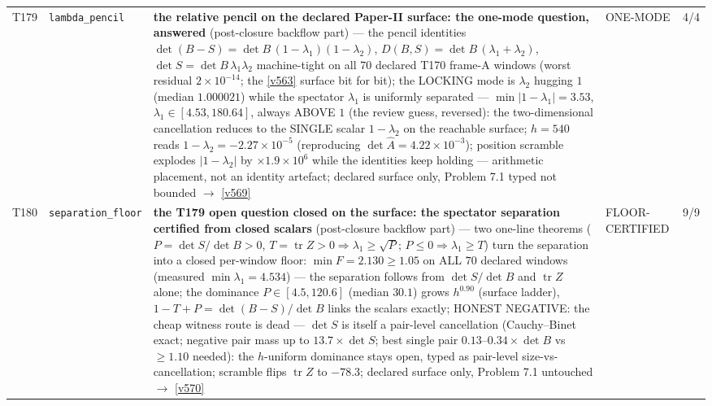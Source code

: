 \documentclass[11pt,a4paper]{article}
\begin{document}
{\begin{xltabular}{\linewidth}{@{}p{0.95cm} >{\raggedright\arraybackslash}p{3.1cm} Y >{\raggedright\scriptsize\arraybackslash}p{3.35cm} p{1.15cm}@{}}
T179 & \texttt{\scriptsize lambda\_\allowbreak pencil} & \textbf{the relative pencil on the declared Paper-II surface: the one-mode question, answered} (post-closure backflow part) --- the pencil identities $\det(B-S)=\det B\,(1-\lambda_1)(1-\lambda_2)$, $D(B,S)=\det B\,(\lambda_1+\lambda_2)$, $\det S=\det B\,\lambda_1\lambda_2$ machine-tight on all $70$ declared T170 frame-A windows (worst residual $2\times10^{-14}$; the \vref{v563} surface bit for bit); the LOCKING mode is $\lambda_2$ hugging $1$ (median $1.000021$) while the spectator $\lambda_1$ is uniformly separated --- $\min|1-\lambda_1|=3.53$, $\lambda_1\in[4.53,180.64]$, always ABOVE $1$ (the review guess, reversed): the two-dimensional cancellation reduces to the SINGLE scalar $1-\lambda_2$ on the reachable surface; $h=540$ reads $1-\lambda_2=-2.27\times10^{-5}$ (reproducing $\det\hat A=4.22\times10^{-3}$); position scramble explodes $|1-\lambda_2|$ by $\times1.9\times10^{6}$ while the identities keep holding --- arithmetic placement, not an identity artefact; declared surface only, Problem 7.1 typed not bounded $\to$ \vref{v569} & ONE-MODE & 4/4\\
T180 & \texttt{\scriptsize separation\_\allowbreak floor} & \textbf{the T179 open question closed on the surface: the spectator separation certified from closed scalars} (post-closure backflow part) --- two one-line theorems ($P=\det S/\det B>0$, $T=\operatorname{tr}Z>0\Rightarrow\lambda_1\ge\sqrt P$; $P\le0\Rightarrow\lambda_1\ge T$) turn the separation into a closed per-window floor: $\min F=2.130\ge1.05$ on ALL $70$ declared windows (measured $\min\lambda_1=4.534$) --- the separation follows from $\det S/\det B$ and $\operatorname{tr}Z$ alone; the dominance $P\in[4.5,120.6]$ (median $30.1$) grows $h^{0.90}$ (surface ladder), $1-T+P=\det(B-S)/\det B$ links the scalars exactly; HONEST NEGATIVE: the cheap witness route is dead --- $\det S$ is itself a pair-level cancellation (Cauchy--Binet exact; negative pair mass up to $13.7\times\det S$; best single pair $0.13$--$0.34\times\det B$ vs $\ge1.10$ needed): the $h$-uniform dominance stays open, typed as pair-level size-vs-cancellation; scramble flips $\operatorname{tr}Z$ to $-78.3$; declared surface only, Problem 7.1 untouched $\to$ \vref{v570} & FLOOR-CERTIFIED & 9/9\\

\end{xltabular}}
\end{document}
